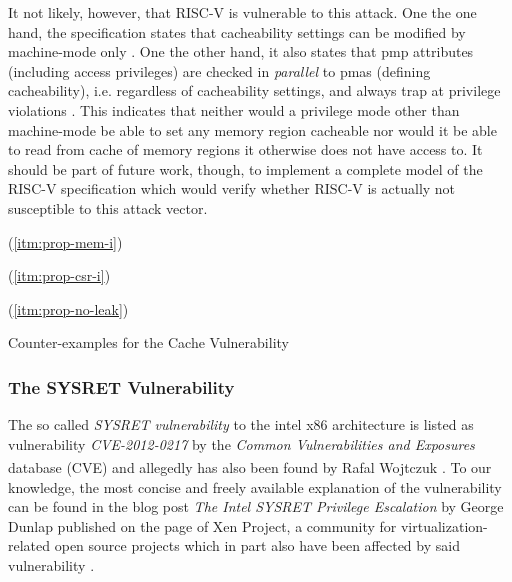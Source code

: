 It not likely, however, that RISC-V is vulnerable to this attack.
One the one hand, the specification states that cacheability settings can be modified by machine-mode only \cite[p.43]{RiscVISAP}.
One the other hand, it also states that \gls{pmp} attributes (including access privileges) are checked in \textit{parallel} to \glspl{pma} (defining cacheability), i.e. regardless of cacheability settings, and always trap at privilege violations \cite[44-45]{RiscVISAP}.
This indicates that neither would a privilege mode other than machine-mode be able to set any memory region cacheable nor would it be able to read from cache of memory regions it otherwise does not have access to.
It should be part of future work, though, to implement a complete model of the RISC-V specification which would verify whether RISC-V is actually not susceptible to this attack vector.

\begin{table}
    \begin{subtable}{\textwidth}
        \centering
        
        \caption{ (\ref{itm:prop-mem-i})}
        \label{tbl:cex-mem-i-cache-vuln}
    \end{subtable}

    \begin{subtable}{\textwidth}
        \centering
        
        \caption{ (\ref{itm:prop-csr-i})}
        \label{tbl:cex-csr-i-cache-vuln}
    \end{subtable}

    \begin{subtable}{\textwidth}
        \centering
        
        \caption{ (\ref{itm:prop-no-leak})}
        \label{tbl:cex-no-leak-cache-vuln}
    \end{subtable}
    \caption{Counter-examples for the Cache Vulnerability}
    \label{tbl:cex-cache-vuln}
\end{table}

\subsubsection{The SYSRET Vulnerability}
\label{sec:sysret}

The so called \textit{SYSRET vulnerability} to the intel x86 architecture is listed as vulnerability \textit{CVE-2012-0217} by the \textit{Common Vulnerabilities and Exposures} database (CVE\textsuperscript{\textregistered}) \cite{SYSRET-vuln} and allegedly has also been found by Rafal Wojtczuk \cite{SYSRETFreeBSD,SYSRETDebian,SYSRETCert}.
To our knowledge, the most concise and freely available explanation of the vulnerability can be found in the blog post \textit{The Intel SYSRET Privilege Escalation} by George Dunlap published on the page of Xen Project, a community for virtualization-related open source projects which in part also have been affected by said vulnerability \cite{Dunlap19}.

